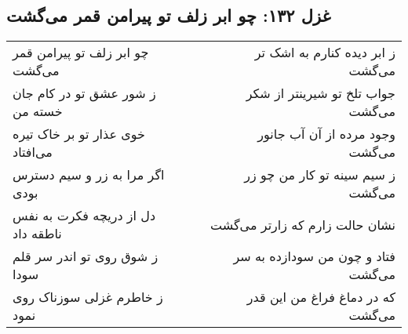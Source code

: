 \begin{center}
\section*{غزل ۱۳۲: چو ابر زلف تو پیرامن قمر می‌گشت}
\label{sec:132}
\begin{longtable}{l p{0.5cm} r}
چو ابر زلف تو پیرامن قمر می‌گشت
&&
ز ابر دیده کنارم به اشک تر می‌گشت
\\
ز شور عشق تو در کام جان خسته من
&&
جواب تلخ تو شیرینتر از شکر می‌گشت
\\
خوی عذار تو بر خاک تیره می‌افتاد
&&
وجود مرده از آن آب جانور می‌گشت
\\
اگر مرا به زر و سیم دسترس بودی
&&
ز سیم سینه تو کار من چو زر می‌گشت
\\
دل از دریچه فکرت به نفس ناطقه داد
&&
نشان حالت زارم که زارتر می‌گشت
\\
ز شوق روی تو اندر سر قلم سودا
&&
فتاد و چون من سودازده به سر می‌گشت
\\
ز خاطرم غزلی سوزناک روی نمود
&&
که در دماغ فراغ من این قدر می‌گشت
\\
\end{longtable}
\end{center}
